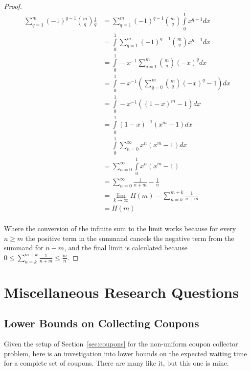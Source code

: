 \documentclass[a4paper]{book}
\begin{document}
\begin{proof}
\begin{align*}
\sum\limits_{q = 1}^m {(-1)}^{q - 1} {m \choose q} \frac{1}{q} &= \sum\limits_{q = 1}^m {(-1)}^{q - 1} {m \choose q} \int\limits_0^1 x^{q - 1} dx\\
&= \int\limits_0^1 \sum\limits_{q = 1}^m {(-1)}^{q - 1} {m \choose q} x^{q - 1} dx\\
&= \int\limits_0^1 -x^{-1} \sum\limits_{q = 1}^m {m \choose q} {(-x)}^q dx\\
&= \int\limits_0^1 -x^{-1} \left( \sum\limits_{q = 0}^m {m \choose q} {(-x)}^q - 1 \right)dx \\
&= \int\limits_0^1 -x^{-1} \left( {(1 - x)}^m - 1 \right)dx \\
&= \int\limits_0^1 {(1 - x)}^{-1} (x^m - 1) dx \\
&= \int\limits_0^1 \sum\limits_{n = 0}^\infty x^n (x^m - 1) dx \\
&= \sum\limits_{n = 0}^\infty \int\limits_0^1 x^n (x^m - 1) \\
&= \sum\limits_{n = 0}^\infty \frac{1}{n + m} - \frac{1}{n} \\
&= \lim\limits_{k \to \infty}  H(m) - \sum\limits_{n = k}^{m + k} \frac{1}{n + m}\\
&= H(m)\\
\end{align*}

Where the conversion of the infinite sum to the limit works because for every \(n \geq m\) the positive term in the summand cancels the negative term from the summand for \(n - m\),
and the final limit is calculated because \(0 \leq \sum\limits_{n = k}^{m + k} \frac{1}{n + m} \leq \frac{m}{n}\).
\end{proof}

\chapter{Miscellaneous Research Questions}

\section{Lower Bounds on Collecting Coupons}\label{sec:couponbounds}

Given the setup of Section~\ref{sec:coupons} for the non-uniform coupon collector problem,
here is an investigation into lower bounds on the expected waiting time for a complete set of coupons.
There are many like it, but this one is mine.
\end{document}
